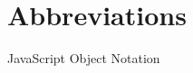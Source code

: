 \chapter*{Abbreviations}

\begin{description}
\setlength{\itemsep}{-11pt}
\setlength{\leftmargin}{900pt}
	\item[JSON] JavaScript Object Notation
\end{description}
